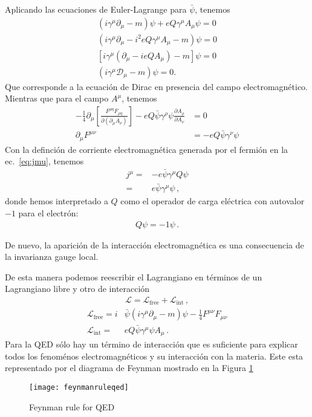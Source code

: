 Aplicando las ecuaciones de Euler-Lagrange para $\bar{\psi}$, tenemos
\begin{align}
  (i\gamma^\mu\partial_\mu-m)\psi+eQ\gamma^\mu A_\mu\psi=0\nonumber\\
  (i\gamma^\mu\partial_\mu-i^2eQ\gamma^\mu A_\mu-m)\psi=0\nonumber\\
  [i\gamma^\mu(\partial_\mu-ieQA_\mu)-m]\psi=0\nonumber\\
  (i\gamma^\mu\mathcal{D}_\mu-m)\psi=0.
\end{align}
Que corresponde a la ecuación de Dirac en presencia del campo electromagnético. Mientras que para el campo $A^\mu$, tenemos
\begin{align}
  -\frac{1}{4}\partial_\mu\left[\frac{F^{\rho\eta}F_{\rho\eta}}{\partial\left(\partial_\mu A_\nu\right)}\right]-eQ\bar{\psi}\gamma^\rho\psi\frac{\partial A_\rho}{\partial A_\nu}&=0\nonumber\\
  \partial_\mu F^{\mu\nu}&=-eQ\bar{\psi}\gamma^\nu\psi
\end{align}
Con la definción de  corriente electromagnética generada por el fermión en la ec.~\eqref{eq:jmu}, tenemos
\begin{align}
  \label{eq:222qft}
  j^\mu=&-e\bar{\psi}\gamma^\mu Q\psi \nonumber\\
       =&e\bar{\psi}\gamma^\mu\psi \,,
\end{align}
donde hemos interpretado a $Q$ como el operador de carga eléctrica con autovalor $-1$ para el electrón:
\begin{align}
  Q\psi =-1\psi\,.
\end{align}

De nuevo, la aparición de la interacción electromagnética es una consecuencia de la invarianza gauge local. 

\begin{frame}
De esta manera podemos reescribir el Lagrangiano en términos de un Lagrangiano libre y otro de interacción
\begin{align}
  \mathcal{L}=\mathcal{L}_{\text{free}}+\mathcal{L}_{\text{int}}\,,
\end{align}
\begin{align}
  \mathcal{L}_{\text{free}}=i&\bar{\psi}\left(i\gamma^\mu\partial_\mu-m\right)\psi-\tfrac{1}{4}F^{\mu\nu}F_{\mu\nu}\nonumber\\
  \mathcal{L}_{\text{int}}=&eQ\bar{\psi}\gamma^\mu\psi A_\mu\,.
\end{align}
Para la QED sólo hay un término de interacción que es suficiente para explicar todos los fenoménos electromagnéticos y su interacción con la materia. Este esta representado por el diagrama de Feynman mostrado en la Figura \ref{fig:feynmanruleqed}

\end{frame}
\begin{frame}
\begin{figure}
  \centering
  \texttt{[image: feynmanruleqed]} %
  \caption{Feynman rule for QED}
  \label{fig:feynmanruleqed}
\end{figure}
\end{frame}


